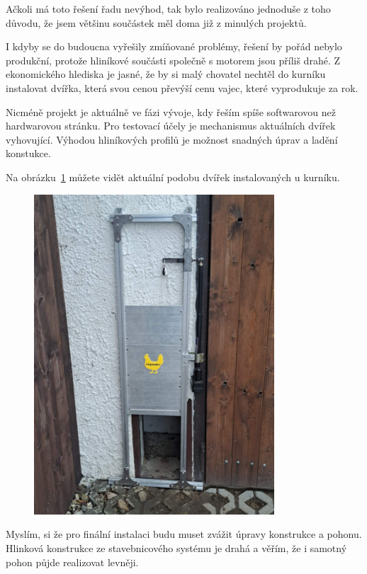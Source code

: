 Ačkoli má toto řešení řadu nevýhod, tak bylo realizováno jednoduše z toho důvodu, že jsem většinu součástek měl doma již z minulých projektů.

I kdyby se do budoucna vyřešily zmíňované problémy, řešení by pořád nebylo produkční, protože hliníkové součásti společně s motorem jsou příliš drahé.
Z ekonomického hlediska je jasné, že by si malý chovatel nechtěl do kurníku instalovat dvířka, která svou cenou převýší cenu vajec, které vyprodukuje za rok.

Nicméně projekt je aktuálně ve fázi vývoje, kdy řeším spíše softwarovou než hardwarovou stránku.
Pro testovací účely je mechanismus aktuálních dvířek vyhovující.
Výhodou hliníkových profilů je možnost snadných úprav a ladění konstukce.

Na obrázku~\ref{fig:proto_dvirka} můžete vidět aktuální podobu dvířek instalovaných u kurníku.

\begin{figure}[h]
    \centering
    \includegraphics[width=0.8\textwidth]{img/proto_dvirka}
    \label{fig:proto_dvirka}
\end{figure}

Myslím, si že pro finální instalaci budu muset zvážit úpravy konstrukce a pohonu.
Hlinková konstrukce ze stavebnicového systému je drahá a věřím, že i samotný pohon půjde realizovat levněji.




